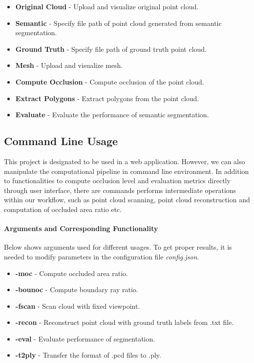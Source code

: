 \documentclass[11pt, a4paper,oneside,chapterprefix=false]{scrbook}
\begin{document}
\begin{itemize}
	\item \textbf{Original Cloud} - Upload and visualize original point cloud.
	\item \textbf{Semantic} - Specify file path of point cloud generated from semantic segmentation.
	\item \textbf{Ground Truth} - Specify file path of ground truth point cloud.
	\item \textbf{Mesh} - Upload and visualize mesh.
	\item \textbf{Compute Occlusion} - Compute occlusion of the point cloud.
	\item \textbf{Extract Polygons} - Extract polygons from the point cloud.
	\item \textbf{Evaluate} - Evaluate the performance of semantic segmentation.
\end{itemize}


\subsection{Command Line Usage}

This project is designated to be used in a web application. However, we can also manipulate the computational pipeline in command line environment. In addition to functionalities to compute occlusion level and evaluation metrics directly through user interface, there are commands performs intermediate operations within our workflow, such as point cloud scanning, point cloud reconstruction and computation of occluded area ratio etc.  

\paragraph{Arguments and Corresponding Functionality}

Below shows arguments used for different usages. To get proper results, it is needed to modify parameters in the configuration file \emph{config.json}.

\begin{itemize}
	\item \textbf{-moc} - Compute occluded area ratio.
	\item \textbf{-bounoc} - Compute boundary ray ratio.
	\item \textbf{-fscan} - Scan cloud with fixed viewpoint.
	\item \textbf{-recon} - Reconstruct point cloud with ground truth labels from .txt file.
	\item \textbf{-eval} - Evaluate performance of segmentation.
        \item \textbf{-t2ply} - Transfer the format of .pcd files to .ply.
\end{itemize}
\end{document}
